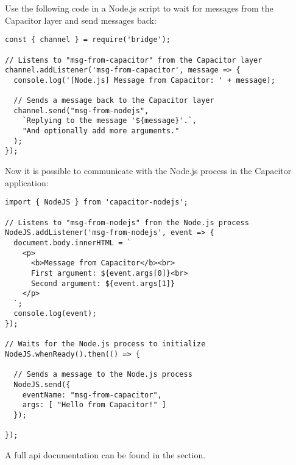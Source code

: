Use the following code in a Node.js script to wait for messages from the Capacitor layer and send messages back:

\begin{verbatim}
const { channel } = require('bridge');

// Listens to "msg-from-capacitor" from the Capacitor layer
channel.addListener('msg-from-capacitor', message => {
  console.log('[Node.js] Message from Capacitor: ' + message);
  
  // Sends a message back to the Capacitor layer
  channel.send("msg-from-nodejs",
    `Replying to the message '${message}'.`,
    "And optionally add more arguments."
  );
});
\end{verbatim}

\vspace{1em}

Now it is possible to communicate with the Node.js process in the Capacitor application:

\begin{verbatim}
import { NodeJS } from 'capacitor-nodejs';

// Listens to "msg-from-nodejs" from the Node.js process
NodeJS.addListener('msg-from-nodejs', event => {
  document.body.innerHTML = `
    <p>
      <b>Message from Capacitor</b><br>
      First argument: ${event.args[0]}<br>
      Second argument: ${event.args[1]}
    </p>
  `;
  console.log(event);
});

// Waits for the Node.js process to initialize
NodeJS.whenReady().then(() => {

  // Sends a message to the Node.js process
  NodeJS.send({
    eventName: "msg-from-capacitor",
    args: [ "Hello from Capacitor!" ]
  });

});
\end{verbatim}

A full \ac{api} documentation can be found in the  section.
